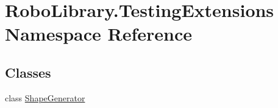 \hypertarget{namespace_robo_library_1_1_testing_extensions}{}\section{Robo\+Library.\+Testing\+Extensions Namespace Reference}
\label{namespace_robo_library_1_1_testing_extensions}
\subsection*{Classes}
\begin{DoxyCompactItemize}
\item 
class \hyperlink{class_robo_library_1_1_testing_extensions_1_1_shape_generator}{Shape\+Generator}
\end{DoxyCompactItemize}

